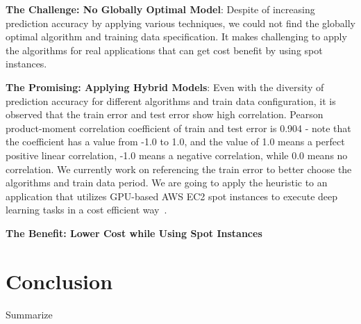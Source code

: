 \documentclass[graybox]{svmult}
\begin{document}
\textbf{The Challenge: No Globally Optimal Model}: Despite of increasing prediction accuracy by applying various techniques, we could not find the globally optimal algorithm and training data specification. It makes challenging to apply the algorithms for real applications that can get cost benefit by using spot instances. 

\textbf{The Promising: Applying Hybrid Models}: Even with the diversity of prediction accuracy for different algorithms and train data configuration, it is observed that the train error and test error show high correlation. Pearson product-moment correlation coefficient of train and test error is 0.904 - note that the coefficient has a value from -1.0 to 1.0, and the value of 1.0 means a perfect positive linear correlation, -1.0 means a negative correlation, while 0.0 means no correlation. We currently work on referencing the train error to better choose the algorithms and train data period. We are going to apply the heuristic to an application that utilizes GPU-based AWS EC2 spot instances to execute deep learning tasks in a cost efficient way~\cite{deep-spot-cloud}. 

\textbf{The Benefit: Lower Cost while Using Spot Instances}
\section{Conclusion}
Summarize



\end{document}
